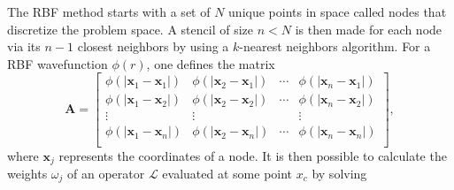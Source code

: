 The RBF method starts with a set of $N$ unique points in space called nodes that discretize the problem space. A stencil of size $n<N$ is then made for each node via its $n-1$ closest neighbors by using a $k$-nearest neighbors algorithm. For a RBF wavefunction $\phi(r)$, one defines the matrix
\begin{equation}
\mathbf{A} = 
\begin{bmatrix}
    \phi(|\mathbf{x}_1-\mathbf{x}_1|) & \phi(|\mathbf{x}_2-\mathbf{x}_1|)  & \cdots & \phi(|\mathbf{x}_n-\mathbf{x}_1|) \\
    \phi(|\mathbf{x}_1-\mathbf{x}_2|) & \phi(|\mathbf{x}_2-\mathbf{x}_2|)  & \cdots & \phi(|\mathbf{x}_n-\mathbf{x}_2|) \\
    \vdots & \vdots  & & \vdots  \\
    \phi(|\mathbf{x}_1-\mathbf{x}_n|) & \phi(|\mathbf{x}_2-\mathbf{x}_n|)  & \cdots & \phi(|\mathbf{x}_n-\mathbf{x}_n|) \\
\end{bmatrix},
\label{eq:rbf_matrix}
\end{equation}
where $\mathbf{x}_j$ represents the coordinates of a node. It is then possible to calculate the weights $\omega_j$ of an operator $\mathcal{L}$ evaluated at some point $x_c$ by solving
